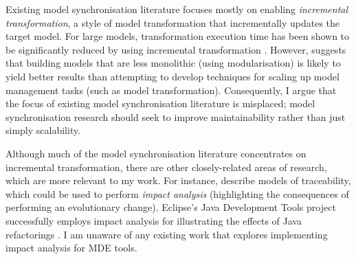 Existing model synchronisation literature focuses mostly on enabling \textit{incremental transformation}, a style of model transformation that incrementally updates the target model. For large models, transformation execution time has been shown to be significantly reduced by using incremental transformation \cite{hearnden06incremental}. However, \cite{kolovos08scalability} suggests that building models that are less monolithic (using modularisation) is likely to yield better results than attempting to develop techniques for scaling up model management tasks (such as model transformation). Consequently, I argue that the focus of existing model synchronisation literature is misplaced; model synchronisation research should seek to improve maintainability rather than just simply scalability.  %

Although much of the model synchronisation literature concentrates on incremental transformation, there are other closely-related areas of research, which are more relevant to my work. For instance, \cite{jouault05loosely,drivalos08loosely} describe models of traceability, which could be used to perform \textit{impact analysis} (highlighting the consequences of performing an evolutionary change). Eclipse's Java Development Tools project successfully employs impact analysis for illustrating the effects of Java refactorings \cite{fuhrer07refactoring}. I am unaware of any existing work that explores implementing impact analysis for MDE tools.